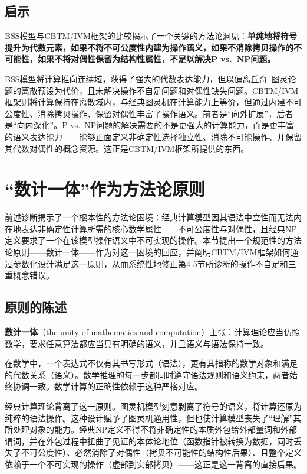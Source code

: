 \documentclass{ctexart}
\begin{document}
	\subsection{启示}
	
	BSS模型与CBTM/IVM框架的比较揭示了一个关键的方法论洞见：\textbf{单纯地将符号提升为代数元素，如果不将不可公度性内建为操作语义，如果不消除拷贝操作的不可能性，如果不将对偶性保留为结构性属性，不足以解决P vs.\ NP问题。}
	
	BSS模型将计算推向连续域，获得了强大的代数表达能力，但以偏离丘奇–图灵论题的离散预设为代价，且未解决操作不自足问题和对偶性缺失问题。CBTM/IVM框架则将计算保持在离散域内，与经典图灵机在计算能力上等价，但通过内建不可公度性、消除拷贝操作、保留对偶性丰富了操作语义。前者是``向外扩展''，后者是``向内深化''。P vs.\ NP问题的解决需要的不是更强大的计算能力，而是更丰富的语义表达能力——能够正面定义非确定性选择独立性、消除不可能操作、并保留其代数对偶性的概念资源。这正是CBTM/IVM框架所提供的东西。
	
	\section{``数计一体''作为方法论原则}
	
	前述诊断揭示了一个根本性的方法论困境：经典计算模型因其语法中立性而无法内在地表达非确定性计算所需的核心数学属性——不可公度性与对偶性，且经典NP定义要求了一个在该模型操作语义中不可实现的操作。本节提出一个规范性的方法论原则——数计一体——作为对这一困境的回应，并阐明CBTM/IVM框架如何通过参数化设计满足这一原则，从而系统性地修正第4-5节所诊断的操作不自足和三重概念错误。
	
	\subsection{原则的陈述}
	
	\textbf{数计一体}（the unity of mathematics and computation）主张：计算理论应当仿照数学，要求任意算法都应当具有明确的语义，并且语义与语法保持一致。
	
	在数学中，一个表达式不仅有其书写形式（语法），更有其指称的数学对象和满足的代数关系（语义）。数学推理的每一步都同时遵守语法规则和语义约束，两者始终协调一致。数学计算的正确性依赖于这种严格对应。
	
	经典计算理论背离了这一原则。图灵机模型刻意剥离了符号的语义，将计算还原为纯粹的语法操作。这种设计赋予了图灵机通用性，但也使计算模型丧失了``理解''其所处理对象的能力。经典NP定义不得不将非确定性的本质外包给外部量词和外部谓词，并在外包过程中扭曲了见证的本体论地位（函数指针被转换为数据，同时丢失了不可公度性）、必然消除了对偶性（拷贝不可能性的结构性后果）、且整个定义依赖于一个不可实现的操作（虚部到实部拷贝）——这正是这一背离的直接后果。
	
\end{document}
